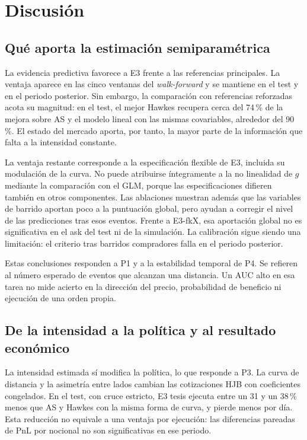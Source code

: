 \chapter{Discusión}
\label{chap:discusion}

\section{Qué aporta la estimación semiparamétrica}

La evidencia predictiva favorece a E3 frente a las referencias principales. La ventaja aparece en las cinco ventanas del \textit{walk-forward} y se mantiene en el test y en el periodo posterior. Sin embargo, la comparación con referencias reforzadas acota su magnitud: en el test, el mejor Hawkes recupera cerca del 74\,\% de la mejora sobre AS y el modelo lineal con las mismas covariables, alrededor del 90\,\%. El estado del mercado aporta, por tanto, la mayor parte de la información que falta a la intensidad constante.

La ventaja restante corresponde a la especificación flexible de E3, incluida su modulación de la curva. No puede atribuirse íntegramente a la no linealidad de $g$ mediante la comparación con el GLM, porque las especificaciones difieren también en otros componentes. Las ablaciones muestran además que las variables de barrido aportan poco a la puntuación global, pero ayudan a corregir el nivel de las predicciones tras esos eventos. Frente a E3-fkX, esa aportación global no es significativa en el ask del test ni de la simulación. La calibración sigue siendo una limitación: el criterio tras barridos compradores falla en el periodo posterior.

Estas conclusiones responden a P1 y a la estabilidad temporal de P4. Se refieren al número esperado de eventos que alcanzan una distancia. Un AUC alto en esa tarea no mide acierto en la dirección del precio, probabilidad de beneficio ni ejecución de una orden propia.

\section{De la intensidad a la política y al resultado económico}

La intensidad estimada sí modifica la política, lo que responde a P3. La curva de distancia y la asimetría entre lados cambian las cotizaciones HJB con coeficientes congelados. En el test, con cruce estricto, E3 tesis ejecuta entre un 31 y un 38\,\% menos que AS y Hawkes con la misma forma de curva, y pierde menos por día. Esta reducción no equivale a una ventaja por ejecución: las diferencias pareadas de PnL por nocional no son significativas en ese periodo.


